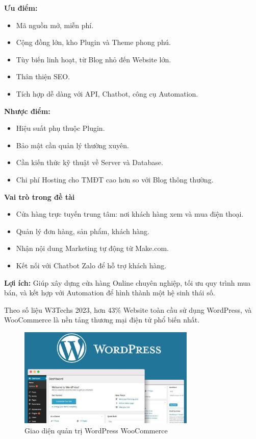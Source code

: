 \textbf{Ưu điểm:}
\begin{itemize}
    \item Mã nguồn mở, miễn phí.
    \item Cộng đồng lớn, kho Plugin và Theme phong phú.
    \item Tùy biến linh hoạt, từ Blog nhỏ đến Website lớn.
    \item Thân thiện SEO.
    \item Tích hợp dễ dàng với API, Chatbot, công cụ Automation.
\end{itemize}

\textbf{Nhược điểm:}
\begin{itemize}
    \item Hiệu suất phụ thuộc Plugin.
    \item Bảo mật cần quản lý thường xuyên.
    \item Cần kiến thức kỹ thuật về Server và Database.
    \item Chi phí Hosting cho TMĐT cao hơn so với Blog thông thường.
\end{itemize}

\textbf{Vai trò trong đề tài}
\begin{itemize}
    \item Cửa hàng trực tuyến trung tâm: nơi khách hàng xem và mua điện thoại.
    \item Quản lý đơn hàng, sản phẩm, khách hàng.
    \item Nhận nội dung Marketing tự động từ Make.com.
    \item Kết nối với Chatbot Zalo để hỗ trợ khách hàng.
\end{itemize}

\textbf{Lợi ích:}  
Giúp xây dựng cửa hàng Online chuyên nghiệp, tối ưu quy trình mua bán, và kết hợp với Automation để hình thành một hệ sinh thái số.

Theo số liệu W3Techs 2023, hơn 43\% Website toàn cầu sử dụng WordPress, và WooCommerce là nền tảng thương mại điện tử phổ biến nhất.

\begin{figure}[h!]
    \centering
    \includegraphics[width=0.75\textwidth]{img/Picture6.png}

    \caption{ Giao diện quản trị WordPress WooCommerce}
    \label{fig:wordpress}
\end{figure}

